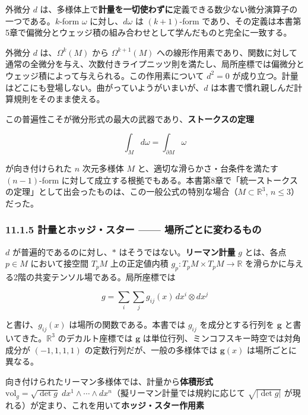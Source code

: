 \documentclass[a4paper,12pt,openany]{book}
\begin{document}
外微分 \(d\)
は、多様体上で\textbf{計量を一切使わずに}定義できる数少ない微分演算子の一つである。\(k\)-form
\(\omega\) に対し、\(d\omega\) は \((k+1)\)-form
であり、その定義は本書第5章で偏微分とウェッジ積の組み合わせとして学んだものと完全に一致する。

外微分 \(d\) は、\(\Omega^k(M)\) から \(\Omega^{k+1}(M)\)
への線形作用素であり、関数に対して通常の全微分を与え、次数付きライプニッツ則を満たし、局所座標では偏微分とウェッジ積によって与えられる。この作用素について
\(d^2 = 0\)
が成り立つ。計量はどこにも登場しない。曲がっていようがいまいが、\(d\)
は本書で慣れ親しんだ計算規則をそのまま使える。

この普遍性こそが微分形式の最大の武器であり、\textbf{ストークスの定理}

\[\int_M d\omega = \int_{\partial M} \omega\]

が向き付けられた \(n\) 次元多様体 \(M\)
と、適切な滑らかさ・台条件を満たす \((n-1)\)-form
に対して成立する根拠でもある。本書第8章で「統一ストークスの定理」として出会ったものは、この一般公式の特別な場合（\(M \subset \mathbb{R}^3\),
\(n \le 3\)）だった。

\hypertarget{ux8a08ux91cfux3068ux30dbux30c3ux30b8ux30b9ux30bfux30fc-ux5834ux6240ux3054ux3068ux306bux5909ux308fux308bux3082ux306e}{%
\subsubsection{11.1.5 計量とホッジ・スター ——
場所ごとに変わるもの}\label{ux8a08ux91cfux3068ux30dbux30c3ux30b8ux30b9ux30bfux30fc-ux5834ux6240ux3054ux3068ux306bux5909ux308fux308bux3082ux306e}}

\(d\) が普遍的であるのに対し、\(\ast\)
はそうではない。\textbf{リーマン計量} \(g\) とは、各点 \(p \in M\)
において接空間 \(T_p M\) 上の正定値内積
\(g_p: T_p M \times T_p M \to \mathbb{R}\)
を滑らかに与える2階の共変テンソル場である。局所座標では

\[g = \sum_i\sum_j g_{ij}(x)\,dx^i \otimes dx^j\]

と書け、\(g_{ij}(x)\) は場所の関数である。本書では \(g_{ij}\)
を成分とする行列を \(\mathbf{g}\) と書いてきた。\(\mathbb{R}^3\)
のデカルト座標では \(\mathbf{g}\)
は単位行列、ミンコフスキー時空では対角成分が \((-1,1,1,1)\)
の定数行列だが、一般の多様体では \(\mathbf{g}(x)\) は場所ごとに異なる。

向き付けられたリーマン多様体では、計量から\textbf{体積形式}
\(\mathrm{vol}_g = \sqrt{\det g}\;dx^1 \wedge \cdots \wedge dx^n\)（擬リーマン計量では規約に応じて
\(\sqrt{|\det g|}\)
が現れる）が定まり、これを用いて\textbf{ホッジ・スター作用素}
\end{document}
